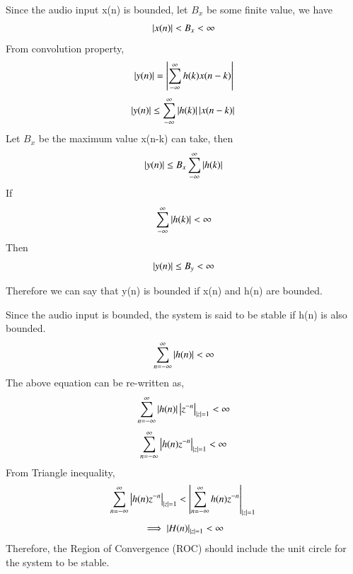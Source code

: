 \documentclass[journal,12pt,twocolumn]{IEEEtran}
\renewcommand\thesection{\arabic{section}}
\begin{document}
\begin{enumerate}[label=\thesection.\arabic*,ref=\thesection.\theenumi]
Since the audio input x(n) is bounded, let $B_x$ be some finite value, we have
\begin{align}
    \left\vert x(n)\right\vert < B_x < \infty
\end{align}
From convolution property,
\begin{equation}
    \left\vert y(n)\right\vert = \left\vert\sum_{-\infty}^{\infty}h(k)x(n-k)\right\vert
\end{equation}
\begin{equation}
    \left\vert y(n)\right\vert \leq \sum_{-\infty}^{\infty}\left\vert h(k)\right\vert\left\vert x(n-k)\right\vert\\
\end{equation}
Let $B_{x}$ be the maximum value x(n-k) can take, then
\begin{equation}
\left\vert y(n)\right\vert \leq B_{x}\sum_{-\infty}^{\infty} \left\vert h(k)\right\vert
\end{equation}
If
\begin{equation}
\sum_{-\infty}^{\infty} \left\vert h(k)\right\vert < \infty
\end{equation}
Then
\begin{equation}
\left\vert y(n)\right\vert \leq B_{y} < \infty
\end{equation}

Therefore we can say that y(n) is bounded if x(n) and h(n) are bounded.

Since the audio input is bounded, the system is said to be stable if h(n) is also bounded.
\begin{equation}
\sum_{n=-\infty}^{\infty} \left\vert h(n)\right\vert<\infty
\end{equation}
The above equation can be re-written as,
\begin{equation}
\sum_{n=-\infty}^{\infty} \left\vert h(n)\right\vert \left\vert z^{-n}\right\vert_{\left\vert z\right\vert=1}<\infty
\end{equation}
\begin{equation}
\sum_{n=-\infty}^{\infty} \left\vert h(n)z^{-n}\right\vert_{\left\vert z\right\vert=1}<\infty
\end{equation}
From Triangle inequality,
\begin{equation}
\sum_{n=-\infty}^{\infty}\left\vert h(n)z^{-n}\right\vert_{\left\vert z\right\vert=1}<\left\vert\sum_{n=-\infty}^{\infty}h(n)z^{-n}\right\vert_{\left\vert z\right\vert=1} \\
\end{equation}
\begin{equation}
\implies \left\vert H(n)\right\vert_{\left\vert z\right\vert=1} < \infty
\end{equation}
Therefore, the Region of Convergence (ROC) should include the unit circle for the system to be stable.


\end{enumerate}
\end{document}
